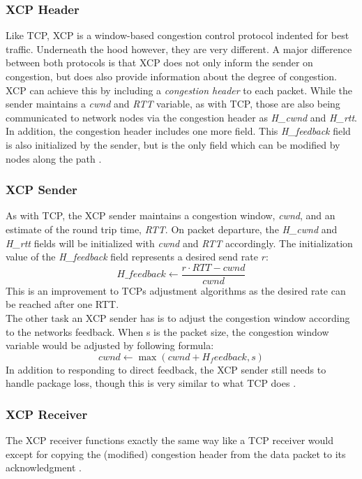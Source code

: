 \documentclass[a4paper,conference]{IEEEtran}
\begin{document}
\subsubsection*{XCP Header}
Like TCP, XCP is a window-based congestion control protocol indented for best traffic. Underneath the hood however, they are very different. A major difference between both protocols is that XCP does not only inform the sender on congestion, but does also provide information about the degree of congestion. XCP can achieve this by including a \textit{congestion header} to each packet. While the sender maintains a \textit{cwnd} and \textit{RTT} variable, as with TCP, those are also being communicated to network nodes via the congestion header as \textit{H\_cwnd} and \textit{H\_rtt}. In addition, the congestion header includes one more field. This \textit{H\_feedback} field is also initialized by the sender, but is the only field which can be modified by nodes along the path \cite{katabi2002congestion,1498331}.

\subsubsection*{XCP Sender}
As with TCP, the XCP sender maintains a congestion window, \textit{cwnd}, and an estimate of the round trip time, \textit{RTT}. On packet departure, the \textit{H\_cwnd} and \textit{H\_rtt} fields will be initialized with \textit{cwnd} and \textit{RTT} accordingly. The initialization value of the \textit{H\_feedback} field represents a desired send rate $r$:
\[H\_feedback \leftarrow \frac{r \cdot RTT - cwnd}{cwnd}\]
This is an improvement to TCPs adjustment algorithms as the desired rate can be reached after one RTT.\\
The other task an XCP sender has is to adjust the congestion window according to the networks feedback. When s is the packet size, the congestion window variable would be adjusted by following formula:
\[cwnd \leftarrow \max(cwnd + H_feedback, s)\]
In addition to responding to direct feedback, the XCP sender still needs to handle package loss, though this is very similar to what TCP does \cite{katabi2002congestion}.

\subsubsection*{XCP Receiver}
The XCP receiver functions exactly the same way like a TCP receiver would except for copying the (modified) congestion header from the data packet to its acknowledgment \cite{katabi2002congestion}.
\end{document}
